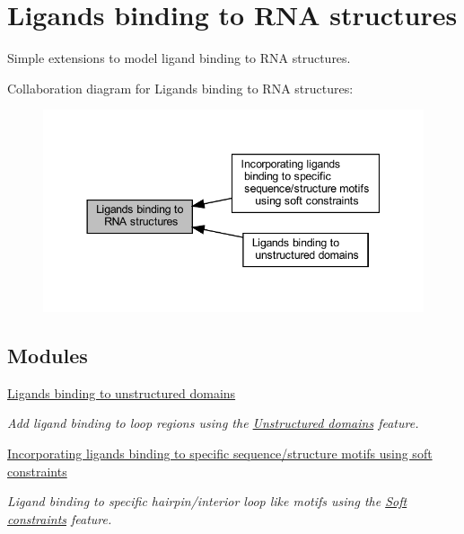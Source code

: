 \hypertarget{group__ligand__binding}{}\section{Ligands binding to R\+NA structures}
\label{group__ligand__binding}


Simple extensions to model ligand binding to R\+NA structures.  


Collaboration diagram for Ligands binding to R\+NA structures\+:
\nopagebreak
\begin{figure}[H]
\begin{center}
\leavevmode
\includegraphics[width=344pt]{group__ligand__binding}
\end{center}
\end{figure}
\subsection*{Modules}
\begin{DoxyCompactItemize}
\item 
\hyperlink{group__ligands__up}{Ligands binding to unstructured domains}
\begin{DoxyCompactList}\small\item\em Add ligand binding to loop regions using the \hyperlink{group__domains__up}{Unstructured domains} feature. \end{DoxyCompactList}\item 
\hyperlink{group__constraints__ligand}{Incorporating ligands binding to specific sequence/structure motifs using soft constraints}
\begin{DoxyCompactList}\small\item\em Ligand binding to specific hairpin/interior loop like motifs using the \hyperlink{group__soft__constraints}{Soft constraints} feature. \end{DoxyCompactList}\end{DoxyCompactItemize}
